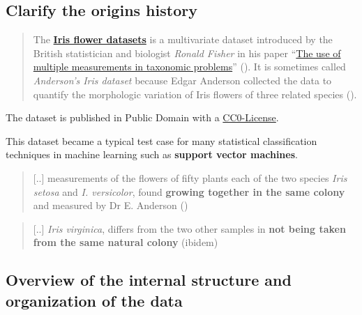 \documentclass [oneside,10pt,a4paper,ngerman,BCOR10mm,headsepline,parindent,final]{scrartcl}
\begin{document}
    \hypertarget{clarify-the-origins-history}{%
\subsection{\texorpdfstring{Clarify the \textbf{origins
history}}{Clarify the origins history}}\label{clarify-the-origins-history}}

\begin{quote}
The
\textbf{\href{https://en.wikipedia.org/wiki/Iris_flower_data_set}{Iris
flower datasets}} is a multivariate dataset introduced by the British
statistician and biologist \emph{Ronald Fisher} in his paper
``\href{https://onlinelibrary.wiley.com/doi/10.1111/j.1469-1809.1936.tb02137.x}{The
use of multiple measurements in taxonomic problems}''
(\cite{Fisher_1936}). It is sometimes called \emph{Anderson's Iris
dataset} because Edgar Anderson collected the data to quantify the
morphologic variation of Iris flowers of three related species
(\cite{Wiki_IrisDS}).
\end{quote}

The dataset is published in Public Domain with a
\href{https://creativecommons.org/share-your-work/public-domain/cc0/}{CC0-License}.

This dataset became a typical test case for many statistical
classification techniques in machine learning such as \textbf{support
vector machines}.

\begin{quote}
{[}..{]} measurements of the flowers of fifty plants each of the two
species \emph{Iris setosa} and \emph{I. versicolor}, found
\textbf{growing together in the same colony} and measured by Dr E.
Anderson (\cite{Fisher_1936})
\end{quote}

\begin{quote}
{[}..{]} \emph{Iris virginica}, differs from the two other samples in
\textbf{not being taken from the same natural colony} (ibidem)
\end{quote}

    \hypertarget{overview-of-the-internal-structure-and-organization-of-the-data}{%
\subsection{\texorpdfstring{Overview of the internal \textbf{structure
and organization} of the
data}{Overview of the internal structure and organization of the data}}\label{overview-of-the-internal-structure-and-organization-of-the-data}}
\end{document}
